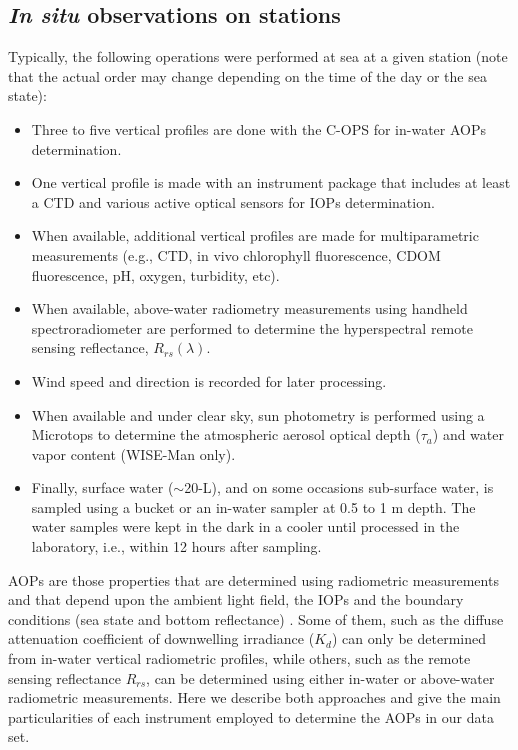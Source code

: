 \documentclass[essd, manuscript]{copernicus}
\begin{document}
\subsection{\textit{In situ} observations on stations} \label{insitu}
Typically, the following operations were performed at sea at a given station (note that the actual order may change depending on the time of the day or the sea state):
\begin{itemize}
  \item Three to five vertical profiles are done with the C-OPS for in-water AOPs determination.
  \item One vertical profile is made with an instrument package that includes at least a CTD and various active optical sensors for IOPs determination.
  \item When available, additional vertical profiles are made for multiparametric measurements (e.g., CTD, in vivo chlorophyll fluorescence, CDOM fluorescence, pH, oxygen, turbidity, etc).
  \item When available, above-water radiometry measurements using handheld spectroradiometer are performed to determine the hyperspectral remote sensing reflectance, $R_{rs}(\lambda)$. 
  \item Wind speed and direction is recorded for later processing. 
  \item When available and under clear sky, sun photometry is performed using a Microtops to determine the atmospheric aerosol optical depth ($\tau_a$) and water vapor content (WISE-Man only).
  \item Finally, surface water ($\sim$20-L), and on some occasions sub-surface water, is sampled using a bucket or an in-water sampler at 0.5 to 1 m depth. The water samples were kept in the dark in a cooler until processed in the laboratory, i.e., within 12 hours after sampling.
\end{itemize}

AOPs are those properties that are determined using radiometric measurements and that depend upon the ambient light field, the IOPs and the boundary conditions (sea state and bottom reflectance) \citep{Preisendorfer1961}.  Some of them, such as the diffuse attenuation coefficient of downwelling irradiance ($K_d$) can only be determined from in-water vertical radiometric profiles, while others, such as the remote sensing reflectance $R_{rs}$, can be determined using either in-water or above-water radiometric measurements.  Here we describe both approaches and give the main particularities of each instrument employed to determine the AOPs in our data set.\\  
\end{document}

